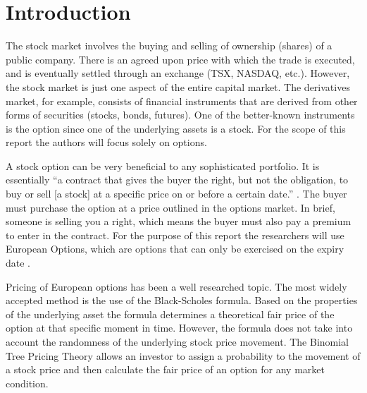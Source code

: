 \documentclass[12pt]{article}
\begin{document}



\newpage 
\doublespacing
{}
\setlength{\parindent}{1cm}

\section{Introduction}
The stock market involves the buying and selling of ownership (shares) of a public company.  There is an agreed upon price with which the trade is executed, and is eventually settled through an exchange (TSX, NASDAQ, etc.).  However, the stock market is just one aspect of the entire capital market. The derivatives market, for example, consists of financial instruments that are derived from other forms of securities (stocks, bonds, futures).  One of the better-known instruments is the option since one of the underlying assets is a stock. For the scope of this report the authors will focus solely on options.

A stock option can be very beneficial to any sophisticated portfolio. It is essentially ``a contract that gives the buyer the right, but not the obligation, to buy or sell [a stock] at a specific price on or before a certain date.'' \cite{volatility}. The buyer must purchase the option at a price outlined in the options market. In brief, someone is selling you a right, which means the buyer must also pay a premium to enter in the contract. For the purpose of this report the researchers will use European Options, which are options that can only be exercised on the expiry date \cite{euro_option}. 

Pricing of European options has been a well researched topic. The most widely accepted method is the use of the Black-Scholes formula. Based on the properties of the underlying asset the formula determines a theoretical fair price of the option at that specific moment in time. However, the formula does not take into account the randomness of the underlying stock price movement. The Binomial Tree Pricing Theory allows an investor to assign a probability to the movement of a stock price and then calculate the fair price of an option for any market condition. 
\end{document}
